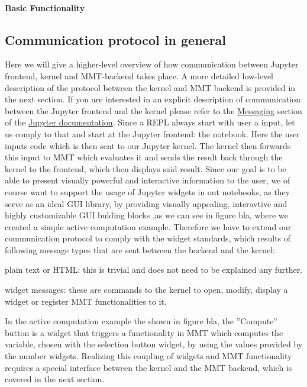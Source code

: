 \paragraph{Basic Functionality}

\subsection{Communication protocol in general}
Here we will give a higher-level overview of how communication between Jupyter frontend, kernel and MMT-backend takes place. A more detailed low-level description of the protocol between the kernel and MMT backend is provided in the next section. If you are interested in an explicit description of communication between the Jupyter frontend and the kernel please refer to the \hyperlink{https://jupyter-client.readthedocs.io/en/latest/messaging.html}{Messaging} section of the \hyperlink{http://jupyter.org/documentation}{Jupyter documentation}. 
Since a REPL always start with user a input, let us comply to that and start at the Jupyter frontend: the notebook. Here the user inputs code which is then sent to our Jupyter kernel. 
The kernel then forwards this input to MMT which evaluates it and sends the result back through the kernel to the frontend, which then displays said result. Since our goal is to be able to present visually powerful and interactive information to the user, we of course want to support the usage of Jupyter widgets in out notebooks, as they serve as an ideal GUI library, by providing visually appealing, interavtive and highly customizable GUI bulding blocks ,as we can see in figure bla, where we created a simple active computation example.
Therefore we have to extend our communication protocol to comply with the widget standards, which results of following message types that are sent between the backend and the kernel:
\begin{inparaenum}[\em 1\rm )]
\item plain text or HTML: this is trivial and does not need to be explained any further.
\item widget messages: these are commands to the kernel to open, modify, display a widget or register MMT functionalities to it.
\end{inparaenum}
In the active computation example the shown in figure bla, the ''Compute'' button is a widget that triggers a functionality in MMT which computes the variable, chosen with the selection button widget, by using the values provided by the number widgets. Realizing this coupling of widgets and MMT functionality requires a special interface between the kernel and the MMT backend, which is covered in the next section.


